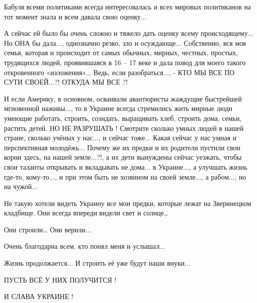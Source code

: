 Бабуля всеми политиками всегда интересовалась и всех мировых политиканов на тот
момент знала и всем давала свою оценку...

А сейчас ей было бы очень сложно и тяжело дать оценку всему происходящему... Но
ОНА бы дала..., однозначно резко, зло и осуждающе... Собственно, вся моя семья,
которая и происходит от самых обычных, мирных, честных, простых, трудящихся
людей, проявившаяся в 16 – 17 веке и дала повод для моего такого откровенного
«изложения»... Ведь, если разобраться...,
- КТО МЫ ВСЕ ПО СУТИ СВОЕЙ...?! ОТКУДА МЫ ВСЕ ?! 

И если Америку, в основном, осваивали авантюристы жаждущие быстрейшей
мгновенной наживы..., то в Украине всегда стремились жить мирные люди умеющие
работать, строить, созидать, выращивать хлеб, строить дома, семьи, растить
детей. НО НЕ РАЗРУШАТЬ ! Смотрите сколько умных людей в нашей стране, сколько
учёных у нас..., и сейчас тоже... Какая сейчас у нас умная и перспективная
молодёжь... Почему же их предки и их родители пустили свои корни здесь, на нашей
земле...?!, а их дети вынуждены сейчас уезжать, чтобы свои таланты открывать и
вкладывать не дома... в Украине..., а улучшать жизнь где-то, кому-то..., и при этом
быть не хозяином на своей земле..., а рабом..., но на чужой... 

Не такую хотели видеть Украину все мои предки, которые лежат на Зверинецком
кладбище. Они всегда впереди видели свет и солнце…

Они строили… Они верили... 

Очень благодарна всем, кто понял меня и услышал...

Жизнь продолжается... И строить её уже будут наши внуки...

ПУСТЬ ВСЁ У НИХ ПОЛУЧИТСЯ !

И СЛАВА УКРАИНЕ !
